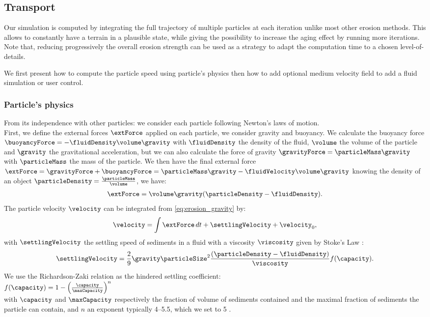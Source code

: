 \subsection{Transport}
Our simulation is computed by integrating the full trajectory of multiple particles at each iteration unlike most other erosion methods. This allows to constantly have a terrain in a plausible state, while giving the possibility to increase the aging effect by running more iterations. 
Note that, reducing progressively the overall erosion strength can be used as a strategy to adapt the computation time to a chosen level-of-details.

We first present how to compute the particle speed using particle's physics then how to add optional medium velocity field to add a fluid simulation or user control.

\subsubsection{Particle's physics}
From its independence with other particles: we consider each particle following Newton's laws of motion.\\
First, we define the external forces $\extForce$ applied on each particle, we consider gravity and buoyancy.
We calculate the buoyancy force $\buoyancyForce = -\fluidDensity \volume \gravity$ with $\fluidDensity$ the density of the fluid, $\volume$ the volume of the particle and $\gravity$ the gravitational acceleration, but we can also calculate the force of gravity $\gravityForce = \particleMass \gravity$ with $\particleMass$ the mass of the particle. We then have the final external force $\extForce = \gravityForce + \buoyancyForce = \particleMass \gravity - \fluidVelocity \volume \gravity$ knowing the density of an object $\particleDensity = \frac{\particleMass}{\volume}$, we have:
\begin{align} \label{eq:erosion_gravity}
\extForce = \volume \gravity (\particleDensity - \fluidDensity ).
\end{align}
The particle velocity $\velocity$ can be integrated from \eqref{eq:erosion_gravity} by: 
\begin{align} \label{eq:erosion_velocity-computation}
\velocity = \int{ \extForce \, dt} + \settlingVelocity + \velocity_0,
\end{align}
with $\settlingVelocity$ the settling speed of sediments in a fluid with a viscosity $\viscosity$ given by Stoke's Law \cite{Stokes1850}: 
\begin{align} \label{eq:erosion_initialSettlingVelocity}
\settlingVelocity = \frac{ 2 }{ 9 }  \gravity \particleSize^2 \frac{(\particleDensity - \fluidDensity)}{\viscosity } f(\capacity).
\end{align} 
We use the Richardson-Zaki relation as the hindered settling coefficient: \\
$f(\capacity) = 1 - \left( \frac{\capacity}{ \maxCapacity } \right)^{n}$ \\
with $\capacity$ and $\maxCapacity$ respectively the fraction of volume of sediments contained and the maximal fraction of sediments the particle can contain, and $n$ an exponent typically 4–5.5, which we set to 5 \cite{Richardson1954, Wojtan2007}.

